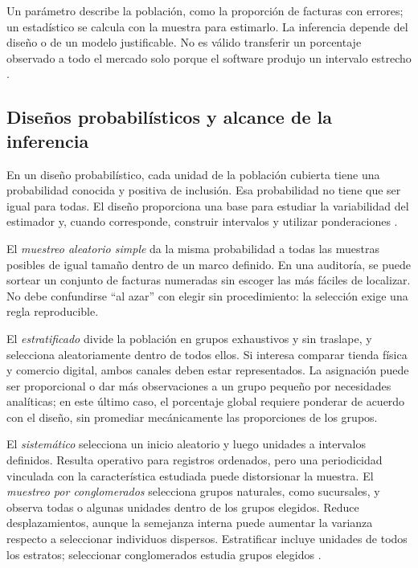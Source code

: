 {Un parámetro describe la población, como la proporción de facturas con errores; un estadístico se calcula con la muestra para estimarlo. La inferencia depende del diseño o de un modelo justificable. No es válido transferir un porcentaje observado a todo el mercado solo porque el software produjo un intervalo estrecho \citep{holmesBusiness2023,wackerly2010}.

\subsection{Diseños probabilísticos y alcance de la inferencia}
En un diseño probabilístico, cada unidad de la población cubierta tiene una probabilidad conocida y positiva de inclusión. Esa probabilidad no tiene que ser igual para todas. El diseño proporciona una base para estudiar la variabilidad del estimador y, cuando corresponde, construir intervalos y utilizar ponderaciones \citep{holmesBusiness2023}.

El \textit{muestreo aleatorio simple} da la misma probabilidad a todas las muestras posibles de igual tamaño dentro de un marco definido. En una auditoría, se puede sortear un conjunto de facturas numeradas sin escoger las más fáciles de localizar. No debe confundirse ``al azar'' con elegir sin procedimiento: la selección exige una regla reproducible.

El \textit{estratificado} divide la población en grupos exhaustivos y sin traslape, y selecciona aleatoriamente dentro de todos ellos. Si interesa comparar tienda física y comercio digital, ambos canales deben estar representados. La asignación puede ser proporcional o dar más observaciones a un grupo pequeño por necesidades analíticas; en este último caso, el porcentaje global requiere ponderar de acuerdo con el diseño, sin promediar mecánicamente las proporciones de los grupos.

El \textit{sistemático} selecciona un inicio aleatorio y luego unidades a intervalos definidos. Resulta operativo para registros ordenados, pero una periodicidad vinculada con la característica estudiada puede distorsionar la muestra. El \textit{muestreo por conglomerados} selecciona grupos naturales, como sucursales, y observa todas o algunas unidades dentro de los grupos elegidos. Reduce desplazamientos, aunque la semejanza interna puede aumentar la varianza respecto a seleccionar individuos dispersos. Estratificar incluye unidades de todos los estratos; seleccionar conglomerados estudia grupos elegidos \citep{holmesBusiness2023}.

}
